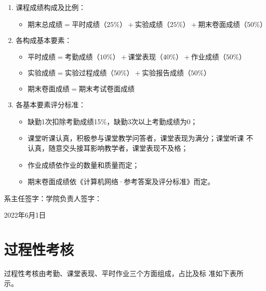 \documentclass{swfuassessment}
\begin{document}
\begin{enumerate}
\item 课程成绩构成及比例：
  \begin{itemize}
  \item \(期末总成绩 = 平时成绩（25\%）+ 实验成绩（25\%）+ 期末卷面成绩（50\%）\)
  \end{itemize}
\item 各构成基本要素：
  \begin{itemize}
  \item \(平时成绩 = 考勤成绩（10\%）+ 课堂表现（40\%）+ 作业成绩（50\%）\)
  \item \(实验成绩 = 实验过程成绩（50\%）+ 实验报告成绩（50\%）\)
  \item \(期末卷面成绩 = 期末考试卷面成绩\)
  \end{itemize}
\item 各基本要素评分标准：
  \begin{itemize}
  \item 缺勤1次扣除考勤成绩15\%，缺勤3次以上考勤成绩为0；
  \item 课堂听课认真，积极参与课堂教学问答者，课堂表现为满分；课堂听课
    不认真，随意交头接耳影响教学者，课堂表现不及格；
  \item 作业成绩依作业的数量和质量而定；
  \item 期末卷面成绩依《计算机网络·参考答案及评分标准》而定。
  \end{itemize}
\end{enumerate}
\vfill
\begin{flushright}
  系主任签字：\hspace{4cm}学院负责人签字：\hspace*{2cm}\par
  \bigskip
  2022年6月1日
\end{flushright}

\headtwo{}

\section{过程性考核}

过程性考核由考勤、课堂表现、平时作业三个方面组成，占比及标
准如下表所示。
\end{document}
